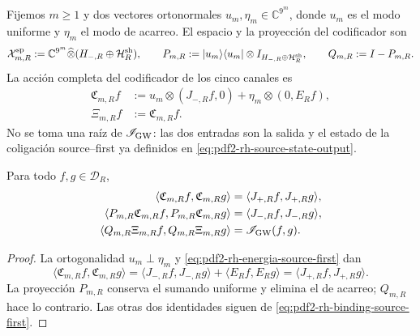 Fijemos \(m\geq1\) y dos vectores ortonormales
\(u_m,\eta_m\in\mathbb C^{9^m}\), donde \(u_m\) es el modo uniforme y
\(\eta_m\) el modo de acarreo. El espacio y la proyección del codificador son
\begin{equation}\label{eq:pdf2-rh-hilbert-comun}
 \mathcal X_{m,R}^{\rm sp}
 :=\mathbb C^{9^m}\widehat\otimes
   (H_{-,R}\oplus\mathcal H_R^{\rm sh}),
 \qquad
 P_{m,R}:=|u_m\rangle\langle u_m|\otimes
 I_{H_{-,R}\oplus\mathcal H_R^{\rm sh}},
 \qquad Q_{m,R}:=I-P_{m,R}.
\end{equation}
La acción completa del codificador de los cinco canales es
\begin{equation}\label{eq:pdf2-rh-xi-comun-explicita}
 \boxed{
 \begin{aligned}
  \mathfrak C_{m,R}f
  &:=u_m\otimes(J_{-,R}f,0)
    +\eta_m\otimes(0,E_Rf),\\
  \Xi_{m,R}f&:=\mathfrak C_{m,R}f.
 \end{aligned}}
\end{equation}
No se toma una raíz de \(\mathscr I_{\rm GW}\): las dos entradas son la
salida y el estado de la coligación source--first ya definidos en
\eqref{eq:pdf2-rh-source-state-output}.

\begin{proposition}
\label{prop:pdf2-rh-vmas-isometria}
Para todo \(f,g\in\mathcal D_R\),
\begin{equation}\label{eq:pdf2-rh-dos-momentos-construidos}
\begin{aligned}
 \langle\mathfrak C_{m,R}f,\mathfrak C_{m,R}g\rangle
  &=\langle J_{+,R}f,J_{+,R}g\rangle,\\
 \langle P_{m,R}\mathfrak C_{m,R}f,
         P_{m,R}\mathfrak C_{m,R}g\rangle
  &=\langle J_{-,R}f,J_{-,R}g\rangle,\\
 \langle Q_{m,R}\Xi_{m,R}f,Q_{m,R}\Xi_{m,R}g\rangle
  &=\mathscr I_{\rm GW}(f,g).
\end{aligned}
\end{equation}
\end{proposition}

\begin{proof}
La ortogonalidad \(u_m\perp\eta_m\) y
\eqref{eq:pdf2-rh-energia-source-first} dan
\[
 \langle\mathfrak C_{m,R}f,\mathfrak C_{m,R}g\rangle
 =\langle J_{-,R}f,J_{-,R}g\rangle
  +\langle E_Rf,E_Rg\rangle
 =\langle J_{+,R}f,J_{+,R}g\rangle.
\]
La proyección \(P_{m,R}\) conserva el sumando uniforme y elimina el de
acarreo; \(Q_{m,R}\) hace lo contrario. Las otras dos identidades siguen de
\eqref{eq:pdf2-rh-binding-source-first}.
\end{proof}

